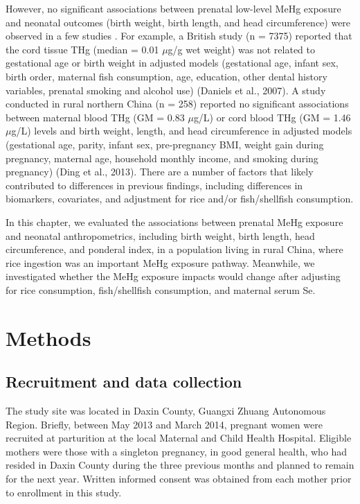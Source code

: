 However, no significant associations between prenatal low-level MeHg exposure and neonatal outcomes (birth weight, birth length, and head circumference) were observed in a few studies \citep{daniels2007maternal,ding2013prenatal,guo2013levels}. For example, a British study (n = 7375) reported that the cord tissue THg (median = 0.01 ${\mu}$g/g wet weight) was not related to gestational age or birth weight in adjusted models (gestational age, infant sex, birth order, maternal fish consumption, age, education, other dental history variables, prenatal smoking and alcohol use) (Daniels et al., 2007). A study conducted in rural northern China (n = 258) reported no significant associations between maternal blood THg (GM = 0.83 ${\mu}$g/L) or cord blood THg (GM = 1.46 ${\mu}$g/L) levels and birth weight, length, and head circumference in adjusted models (gestational age, parity, infant sex, pre-pregnancy BMI, weight gain during pregnancy, maternal age, household monthly income, and smoking during pregnancy) (Ding et al., 2013). There are a number of factors that likely contributed to differences in previous findings, including differences in biomarkers, covariates, and adjustment for rice and/or fish/shellfish consumption.

In this chapter, we evaluated the associations between prenatal MeHg exposure and neonatal anthropometrics, including birth weight, birth length, head circumference, and ponderal index, in a population living in rural China, where rice ingestion was an important MeHg exposure pathway. Meanwhile, we investigated whether the MeHg exposure impacts would change after adjusting for rice consumption, fish/shellfish consumption, and maternal serum Se.

\section{Methods}

\subsection{Recruitment and data collection}

The study site was located in Daxin County, Guangxi Zhuang Autonomous Region. Briefly, between May 2013 and March 2014, pregnant women were recruited at parturition at the local Maternal and Child Health Hospital. Eligible mothers were those with a singleton pregnancy, in good general health, who had resided in Daxin County during the three previous months and planned to remain for the next year. Written informed consent was obtained from each mother prior to enrollment in this study.

